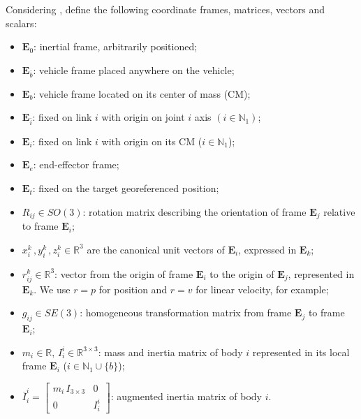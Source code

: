 Considering , define the following coordinate frames, matrices, vectors and scalars:
%
\begin{itemize}
\item $\mathbf{E}_0$: inertial frame, arbitrarily positioned;
\item $\mathbf{E}_{\bar{b}}$: vehicle frame placed anywhere on the vehicle;
\item $\mathbf{E}_b$: vehicle frame located on its center of mass (CM);
\item $\mathbf{E}_{\bar{i}}$: fixed on link $i$ with origin on joint $i$ axis $(i \in \mathbb{N}_1)$;
\item $\mathbf{E}_{i}$: fixed on link $i$ with origin on its CM ($i \in \mathbb{N}_1$);
\item $\mathbf{E}_{e}$: end-effector frame;
\item $\mathbf{E}_{t}$: fixed on the target georeferenced position;
\item $R_{ij} \in SO(3)$: rotation matrix describing the orientation of frame $\mathbf{E}_j$ relative to frame        $\mathbf{E}_i$;
%
\item $x^k_i\,,y^k_i\,,z^k_i \in \mathbb{R}^{3}$ are the canonical unit vectors of $\mathbf{E}_i$, expressed in $\mathbf{E}_k$;
%
%
\item $r^{k}_{ij} \in \mathbb{R}^{3}$: vector from the origin of frame $\mathbf{E}_i$ to the origin of $\mathbf{E}_{j}$, represented in $\mathbf{E}_k$. We use $r=p$ for position and $r=v$ for linear velocity, for example;
%
\item $g_{ij} \in SE(3)$: homogeneous transformation matrix from frame $\mathbf{E}_j$ to frame $\mathbf{E}_i$;
%
%
\item $m_i \in \mathbb{R} ,\, I^i_i \in \mathbb{R}^{3 \times 3}$: mass and inertia matrix of body $i$ represented in its  local frame
$\mathbf{E}_{i}$ ($i \in \mathbb{N}_1 \cup \{b\}$);
%
\item $\overline{I}^i_i =
\left[\begin{array}{cc}
\!\! m_i \, I_{3\times3} \!\!&\!\!  0 \!\! \\
\!\! 0 \!\!&\!\! I^i_i \!\!
\end{array}\right]$: augmented inertia matrix of body $i$.
%
\end{itemize}

